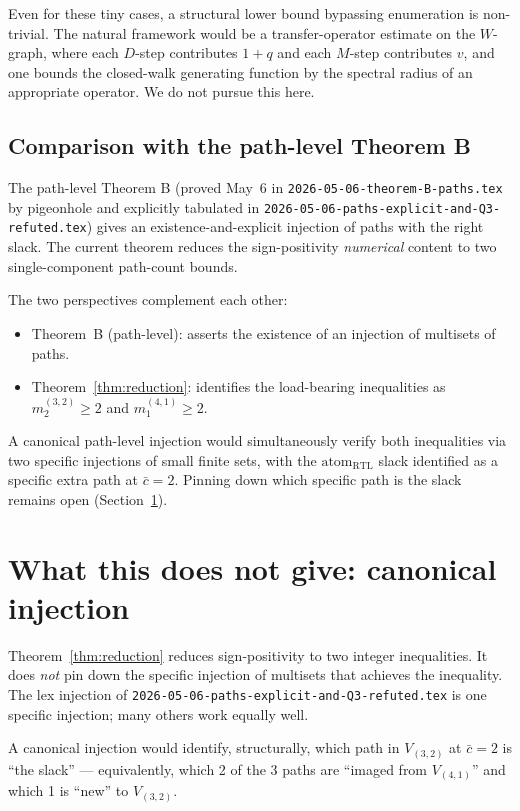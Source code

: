 \documentclass[11pt]{article}
\theoremstyle{definition}
\begin{document}
Even for these tiny cases, a structural lower bound bypassing enumeration is non-trivial. The natural framework would be a transfer-operator estimate on the $W$-graph, where each $D$-step contributes $1+q$ and each $M$-step contributes $v$, and one bounds the closed-walk generating function by the spectral radius of an appropriate operator. We do not pursue this here.

\subsection*{Comparison with the path-level Theorem B}

The path-level Theorem B (proved May~6 in \texttt{2026-05-06-theorem-B-paths.tex} by pigeonhole and explicitly tabulated in \texttt{2026-05-06-paths-explicit-and-Q3-refuted.tex}) gives an existence-and-explicit injection of paths with the right slack. The current theorem reduces the sign-positivity \emph{numerical} content to two single-component path-count bounds.

The two perspectives complement each other:
\begin{itemize}[leftmargin=2em,topsep=0.3em,itemsep=0.2em]
\item Theorem~B (path-level): asserts the existence of an injection of multisets of paths.
\item Theorem~\ref{thm:reduction}: identifies the load-bearing inequalities as $m^{(3,2)}_2 \geq 2$ and $m^{(4,1)}_1 \geq 2$.
\end{itemize}

A canonical path-level injection would simultaneously verify both inequalities via two specific injections of small finite sets, with the $\mathrm{atom}_{\mathrm{RTL}}$ slack identified as a specific extra path at $\bar c = 2$. Pinning down which specific path is the slack remains open (Section~\ref{sec:open}).

\section{What this does not give: canonical injection}\label{sec:open}

Theorem~\ref{thm:reduction} reduces sign-positivity to two integer inequalities. It does \emph{not} pin down the specific injection of multisets that achieves the inequality. The lex injection of \texttt{2026-05-06-paths-explicit-and-Q3-refuted.tex} is one specific injection; many others work equally well.

A canonical injection would identify, structurally, which path in $V_{(3,2)}$ at $\bar c = 2$ is ``the slack'' --- equivalently, which 2 of the 3 paths are ``imaged from $V_{(4,1)}$'' and which 1 is ``new'' to $V_{(3,2)}$.
\end{document}
